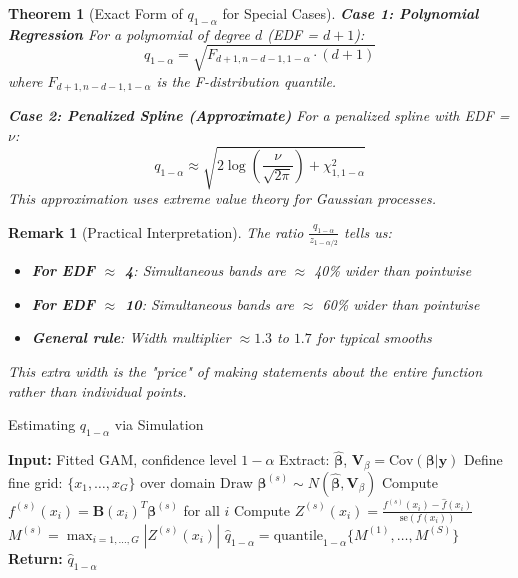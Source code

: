 \documentclass[12pt]{article}
\newtheorem{theorem}{Theorem}
\newtheorem{remark}{Remark}
\begin{document}
\begin{theorem}[Exact Form of $q_{1-\alpha}$ for Special Cases]
\textbf{Case 1: Polynomial Regression}
For a polynomial of degree $d$ (EDF = $d+1$):
\begin{equation}
q_{1-\alpha} = \sqrt{F_{d+1,n-d-1,1-\alpha} \cdot (d+1)}
\end{equation}
where $F_{d+1,n-d-1,1-\alpha}$ is the F-distribution quantile.

\textbf{Case 2: Penalized Spline (Approximate)}
For a penalized spline with EDF = $\nu$:
\begin{equation}
q_{1-\alpha} \approx \sqrt{2\log\left(\frac{\nu}{\sqrt{2\pi}}\right) + \chi^2_{1,1-\alpha}}
\end{equation}
This approximation uses extreme value theory for Gaussian processes.
\end{theorem}

\begin{remark}[Practical Interpretation]
The ratio $\frac{q_{1-\alpha}}{z_{1-\alpha/2}}$ tells us:
\begin{itemize}
   \item \textbf{For EDF $\approx$ 4}: Simultaneous bands are $\approx$ 40\% wider than pointwise
   \item \textbf{For EDF $\approx$ 10}: Simultaneous bands are $\approx$ 60\% wider than pointwise
   \item \textbf{General rule}: Width multiplier $\approx 1.3$ to $1.7$ for typical smooths
\end{itemize}

This extra width is the "price" of making statements about the entire function rather than individual points.
\end{remark}

\begin{algorithm}
\caption{Estimating $q_{1-\alpha}$ via Simulation}
\begin{algorithmic}[1]
\State \textbf{Input:} Fitted GAM, confidence level $1-\alpha$
\State Extract: $\hat{\boldsymbol{\beta}}$, $\mathbf{V}_\beta = \text{Cov}(\boldsymbol{\beta}|\mathbf{y})$
\State Define fine grid: $\{x_1, \ldots, x_G\}$ over domain
   \State Draw $\boldsymbol{\beta}^{(s)} \sim N(\hat{\boldsymbol{\beta}}, \mathbf{V}_\beta)$
   \State Compute $f^{(s)}(x_i) = \mathbf{B}(x_i)^T\boldsymbol{\beta}^{(s)}$ for all $i$
   \State Compute $Z^{(s)}(x_i) = \frac{f^{(s)}(x_i) - \hat{f}(x_i)}{\text{se}(f(x_i))}$
   \State $M^{(s)} = \max_{i=1,\ldots,G} |Z^{(s)}(x_i)|$
\EndFor
\State $\hat{q}_{1-\alpha} = \text{quantile}_{1-\alpha}\{M^{(1)}, \ldots, M^{(S)}\}$
\State \textbf{Return:} $\hat{q}_{1-\alpha}$
\end{algorithmic}
\end{algorithm}
\end{document}

